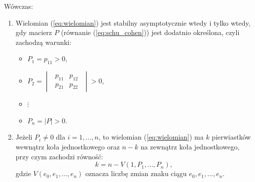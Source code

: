 \documentclass{article}
\begin{document}
        Wówczas:
        \begin{enumerate}
            \item Wielomian (\ref{eq:wielomian}) jest stabilny asymptotycznie wtedy i tylko wtedy, gdy macierz $P$ (równanie (\ref{eq:schu_cohen})) jest dodatnio określona, czyli zachodzą warunki:
            \begin{itemize}
                \item $P_{1} = p_{11} > 0$,
                \item $P_{2}
                =
                \begin{vmatrix}
                \begin{array}{cc}
                    p_{11}  &   p_{12}\\
                    p_{21}  &   p_{22}
                \end{array}
                \end{vmatrix} > 0
                $,
                \item $\vdots$
                \item $P_{n} = |P| > 0$.
            \end{itemize}

            \item Jeżeli $P_{i} \neq 0$ dla $i = 1, \dots, n$, to wielomian (\ref{eq:wielomian}) ma $k$ pierwiastków wewnątrz koła jednostkowego oraz $n-k$ na zewnątrz koła jednostkowego, przy czym zachodzi równość:
            \begin{equation}
                \label{eq:stab_kryt_k}
                k = n - V(1, P_{1}, \dots, P_{n}),
            \end{equation}
            gdzie $V(e_{0}, e_{1}, \dots, e_{n})$ oznacza liczbę zmian znaku ciągu $e_{0}, e_{1}, \dots, e_{n}$.
        \end{enumerate}

\end{document}
